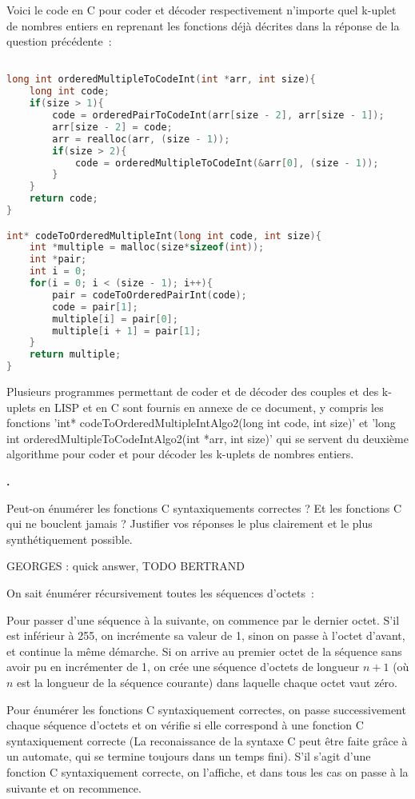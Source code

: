 \documentclass{article}
\newcounter{enoncecount}
\newenvironment{enonce}
{
\stepcounter{enoncecount}
\bf\small \arabic{enoncecount}.
\begin{bf}
}
{
\end{bf}
}
\begin{document}
Voici le code en C pour coder et décoder respectivement n'importe quel k-uplet de nombres entiers en reprenant les fonctions déjà décrites dans la réponse de la question précédente~:

\begin{lstlisting}[language=C]

long int orderedMultipleToCodeInt(int *arr, int size){
	long int code;	
	if(size > 1){
		code = orderedPairToCodeInt(arr[size - 2], arr[size - 1]);
		arr[size - 2] = code;
		arr = realloc(arr, (size - 1));
		if(size > 2){		
			code = orderedMultipleToCodeInt(&arr[0], (size - 1));
		}
	}
	return code;
}

int* codeToOrderedMultipleInt(long int code, int size){
	int *multiple = malloc(size*sizeof(int));
	int *pair;
	int i = 0;
	for(i = 0; i < (size - 1); i++){
		pair = codeToOrderedPairInt(code);
		code = pair[1];
		multiple[i] = pair[0];
		multiple[i + 1] = pair[1];
	}
	return multiple;
}

\end{lstlisting}


Plusieurs programmes permettant de coder et de décoder des couples et des k-uplets en LISP et en C sont fournis en annexe de ce document, y compris les fonctions 'int* codeToOrderedMultipleIntAlgo2(long int code, int size)' et 'long int orderedMultipleToCodeIntAlgo2(int *arr, int size)' qui se servent du deuxième algorithme pour coder et pour décoder les k-uplets de nombres entiers.  


\begin{enonce}
  Peut-on énumérer les fonctions C syntaxiquements correctes ? Et les fonctions C qui ne bouclent jamais ? Justifier vos réponses le plus
  clairement et le plus synthétiquement possible.
\end{enonce}

GEORGES : quick answer, TODO BERTRAND

On sait énumérer récursivement toutes les séquences d'octets~:

Pour passer d'une séquence à la suivante, on commence par le dernier octet. S'il est inférieur à 255, on incrémente sa valeur de 1, sinon on passe à l'octet d'avant, et continue la même démarche. Si on arrive au premier octet de la séquence sans avoir pu en incrémenter de 1, on crée une séquence d'octets de longueur $n + 1$ (où $n$ est la longueur de la séquence courante) dans laquelle chaque octet vaut zéro.

Pour énumérer les fonctions C syntaxiquement correctes, on passe successivement chaque séquence d'octets et on vérifie si elle correspond à une fonction C syntaxiquement correcte (La reconaissance de la syntaxe C peut être faite grâce à un automate, qui se termine toujours dans un temps fini). S'il s'agit d'une fonction C syntaxiquement correcte, on l'affiche, et dans tous les cas on passe à la suivante et on recommence.
\end{document}

